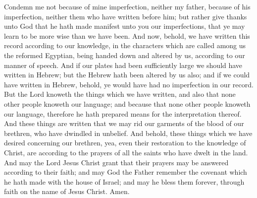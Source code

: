 Condemn me not because of mine imperfection, neither my father, because of his imperfection, neither them who have written before him; but rather give thanks unto God that he hath made manifest unto you our imperfections, that ye may learn to be more wise than we have been.
\bverse \iffalse And now, behold, we have written this record according to our knowledge, in the characters which are called among us the reformed Egyptian, being handed down and altered by us, according to our manner of speech. \fi
And now, behold, we have written this record according to our knowledge, in the characters which are called among us the reformed Egyptian, being handed down and altered by us, according to our manner of speech.
\bverse \iffalse And if our plates had been sufficiently large we should have written in Hebrew; but the Hebrew hath been altered by us also; and if we could have written in Hebrew, behold, ye would have had no imperfection in our record. \fi
And if our plates had been sufficiently large we should have written in Hebrew; but the Hebrew hath been altered by us also; and if we could have written in Hebrew, behold, ye would have had no imperfection in our record.
\bverse \iffalse But the Lord knoweth the things which we have written, and also that none other people knoweth our language; and because that none other people knoweth our language, therefore he hath prepared means for the interpretation thereof. \fi
But the Lord knoweth the things which we have written, and also that none other people knoweth our language; and because that none other people knoweth our language, therefore he hath prepared means for the interpretation thereof.
\bverse \iffalse And these things are written that we may rid our garments of the blood of our brethren, who have dwindled in unbelief. \fi
And these things are written that we may rid our garments of the blood of our brethren, who have dwindled in unbelief.
\bverse \iffalse And behold, these things which we have desired concerning our brethren, yea, even their restoration to the knowledge of Christ, are according to the prayers of all the saints who have dwelt in the land. \fi
And behold, these things which we have desired concerning our brethren, yea, even their restoration to the knowledge of Christ, are according to the prayers of all the saints who have dwelt in the land.
\bverse \iffalse And may the Lord Jesus Christ grant that their prayers may be answered according to their faith; and may God the Father remember the covenant which he hath made with the house of Israel; and may he bless them forever, through faith on the name of Jesus Christ. Amen. \fi
And may the Lord Jesus Christ grant that their prayers may be answered according to their faith; and may God the Father remember the covenant which he hath made with the house of Israel; and may he bless them forever, through faith on the name of Jesus Christ. Amen.
